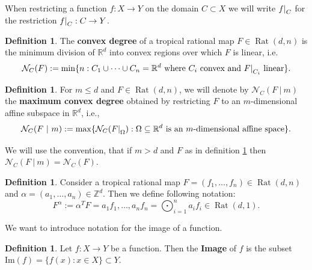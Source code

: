 \documentclass{article}
\theoremstyle{definition}
\newtheorem{definition}[theorem]{Definition}
\DeclareMathOperator{\Rat}{Rat}
\newcommand\restr[2]{{%
  \left.\kern-\nulldelimiterspace %
  #1 %
  \right|_{#2} %
  }}
\begin{document}
When restricting a function $f: X \to Y$ on the domain $C \subset X$ we will write $\restr{f}{C}$ for the restriction $\restr{f}{C} : C \to Y$.

\begin{definition}\hspace{1sp}\cite[p.~15]{zhang2018tropical}
The \textbf{convex degree} of a tropical rational map $F \in \Rat(d,n)$ is the minimum division of $\mathbb{R}^{d}$ into convex
regions over which $F$ is linear, i.e.
$$\mathcal{N}_{C}(F) := \min\{n:C_1 \cup \dots \cup C_n = \mathbb{R}^{d} \ \text{where} \ C_i \ \text{convex and} \ \restr{F}{C_i} \ \text{linear}\}.$$
\end{definition}

\begin{definition}\hspace{1sp}\cite{maclagan2015introduction}\label{def:conv_deg_restr}
For $m \leq d$ and $F \in \Rat(d,n)$, we will denote by $\mathcal{N}_{C}(F \ | \ m)$ the \textbf{maximum convex degree} obtained by restricting $F$ to an $m$-dimensional affine subspace in $\mathbb{R}^{d}$, i.e.,
$$\mathcal{N}_C(F \ | \ m) := \max \{ \mathcal{N}_C(\restr{F}{\Omega}): \Omega \subseteq \mathbb{R}^{d} \ \text{is an} \ m \text{-dimensional affine space} \}.$$
\end{definition}

We will use the convention, that if $m > d$ and $F$ as in definition \ref{def:conv_deg_restr} then $\mathcal{N}_C(F \ | \ m) = \mathcal{N}_C(F)$.

\begin{definition}\hspace{1sp}\cite{maclagan2015introduction}
Consider a tropical rational map $F=(f_1, \dots , f_n) \in \Rat(d, n)$ and $\alpha = (a_1, \dots , a_n) \in \mathbb{Z}^{d}$. Then we define following notation:
$$F^{\alpha} := \alpha^{T} F = a_1 f_1 , \dots , a_n f_n = \displaystyle\bigodot_{i=1}^{n} a_i f_i \in \Rat(d, 1).$$
\end{definition}

We want to introduce notation for the image of a function.

\begin{definition}
Let $f: X \to Y$ be a function. Then the \textbf{Image} of $f$ is the subset $\text{Im}(f) = \{f(x) : x \in X\} \subset Y$.
\end{definition}
\end{document}
